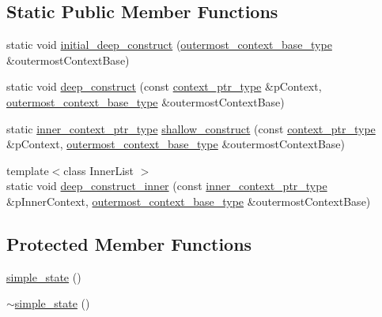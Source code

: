 \subsection*{Static Public Member Functions}
\begin{DoxyCompactItemize}
\item 
static void \mbox{\hyperlink{classboost_1_1statechart_1_1simple__state_a082eb6f318470e080ca90502d32fde98}{initial\+\_\+deep\+\_\+construct}} (\mbox{\hyperlink{classboost_1_1statechart_1_1simple__state_a50f21d7a7d6632eb34430e74cbad3197}{outermost\+\_\+context\+\_\+base\+\_\+type}} \&outermost\+Context\+Base)
\item 
static void \mbox{\hyperlink{classboost_1_1statechart_1_1simple__state_a0676228f11200b54ab55883626eac8cd}{deep\+\_\+construct}} (const \mbox{\hyperlink{classboost_1_1statechart_1_1simple__state_ac7e361322d53b3f57976ff23056b59e7}{context\+\_\+ptr\+\_\+type}} \&p\+Context, \mbox{\hyperlink{classboost_1_1statechart_1_1simple__state_a50f21d7a7d6632eb34430e74cbad3197}{outermost\+\_\+context\+\_\+base\+\_\+type}} \&outermost\+Context\+Base)
\item 
static \mbox{\hyperlink{classboost_1_1statechart_1_1simple__state_ad6d3233a11a23e91b4cc9edcae799379}{inner\+\_\+context\+\_\+ptr\+\_\+type}} \mbox{\hyperlink{classboost_1_1statechart_1_1simple__state_a598d677d3cf6b90001e19ef3566eca5e}{shallow\+\_\+construct}} (const \mbox{\hyperlink{classboost_1_1statechart_1_1simple__state_ac7e361322d53b3f57976ff23056b59e7}{context\+\_\+ptr\+\_\+type}} \&p\+Context, \mbox{\hyperlink{classboost_1_1statechart_1_1simple__state_a50f21d7a7d6632eb34430e74cbad3197}{outermost\+\_\+context\+\_\+base\+\_\+type}} \&outermost\+Context\+Base)
\item 
{\footnotesize template$<$class Inner\+List $>$ }\\static void \mbox{\hyperlink{classboost_1_1statechart_1_1simple__state_afd4eafb6cad34c3618530d763f308f4c}{deep\+\_\+construct\+\_\+inner}} (const \mbox{\hyperlink{classboost_1_1statechart_1_1simple__state_ad6d3233a11a23e91b4cc9edcae799379}{inner\+\_\+context\+\_\+ptr\+\_\+type}} \&p\+Inner\+Context, \mbox{\hyperlink{classboost_1_1statechart_1_1simple__state_a50f21d7a7d6632eb34430e74cbad3197}{outermost\+\_\+context\+\_\+base\+\_\+type}} \&outermost\+Context\+Base)
\end{DoxyCompactItemize}
\subsection*{Protected Member Functions}
\begin{DoxyCompactItemize}
\item 
\mbox{\hyperlink{classboost_1_1statechart_1_1simple__state_a362ee00744c845c6ee6c96a131a5f8af}{simple\+\_\+state}} ()
\item 
\mbox{\hyperlink{classboost_1_1statechart_1_1simple__state_a312e609b9fbe59276689c9af33c3b3c9}{$\sim$simple\+\_\+state}} ()
\end{DoxyCompactItemize}
